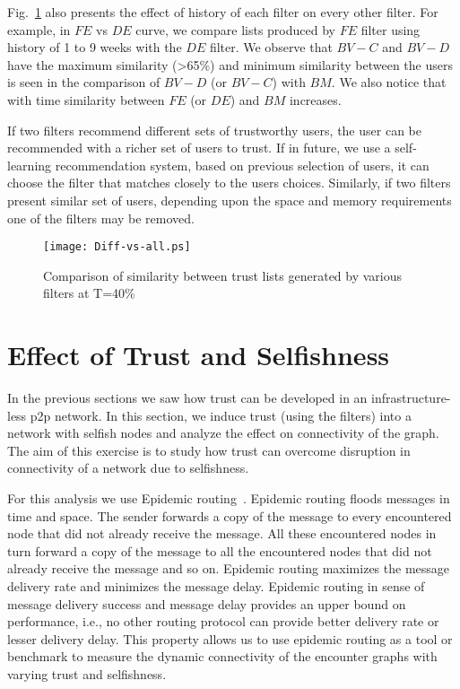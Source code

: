 \documentclass[10pt,conference]{IEEEtran}
\begin{document}
Fig.~\ref{fig:correlate} also presents the effect of history of each filter on every other filter. For example, in $FE$ vs $DE$ curve, we compare lists produced by $FE$ filter using history of 1 to 9 weeks with the $DE$ filter.  We observe that $BV-C$ and $BV-D$ have the maximum similarity (\textgreater 65\%) and minimum similarity between the users is seen in the comparison of $BV-D$ (or $BV-C$) with $BM$.  We also notice that with time similarity between $FE$ (or $DE$) and $BM$ increases.

If two filters recommend different sets of trustworthy users, the user can be recommended with a richer set of users to trust. If in future, we use a self-learning recommendation system, based on previous selection of users, it can choose the filter that matches closely to the users choices. Similarly, if two filters present similar set of users, depending upon the space and memory requirements one of the filters may be removed. 


\begin{figure}
\centering

\texttt{[image: Diff-vs-all.ps]} 
\caption{Comparison of similarity between trust lists generated by various filters at T=40\%}
\label{fig:correlate}
\end{figure}




\section{Effect of Trust and Selfishness} \label{epidemic}



In the previous sections we saw how trust can be developed in an infrastructure-less p2p network. In this section, we induce trust (using the filters) into a network with selfish nodes and analyze the effect on connectivity of the graph. The aim of this exercise is to study how trust can overcome disruption in connectivity of a network due to selfishness.

For this analysis we use Epidemic routing~\cite{epidemic}. Epidemic routing floods messages in time and space. The sender forwards a copy of the message to every encountered node that did not already receive the message. All these encountered nodes in turn forward a copy of the message to all the encountered nodes that did not already receive the message and so on.  Epidemic routing maximizes the message delivery rate and minimizes the message delay.  Epidemic routing in sense of message delivery success and message delay provides an upper bound on performance, i.e., no other routing protocol can provide better delivery rate or lesser delivery delay. This property allows us to use epidemic routing as a tool or benchmark to measure the dynamic connectivity of the encounter graphs with varying trust and selfishness.
\end{document}
